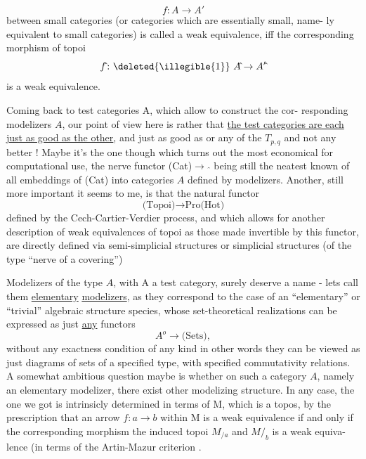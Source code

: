 \[ f\colon A \longrightarrow A' \]
between small categories (or categories which are essentially small, name-%
ly equivalent to small categories) is called a weak equivalence, iff the
corresponding morphism of topoi
\[ f\hat{}\colon \deleted{\illegible{1}}\ A\hat{} \to A'\hat{} \]
is a weak equivalence.

Coming back to test categories A, which allow to construct the cor-%
responding modelizers $A\hat{}$, our point of view here is rather that \uline{the test
categories are each just as good  as the other}, and \hand{$\Delta$} just as good as
\hand{$\Box$} or any of the $T_{p,q}$ and not any better ! Maybe it's the one though which
turns out the most economical for computational use, the nerve functor
(Cat)$\to$ \hand{$\Delta$}$\hat{}$ being still the neatest known of all  embeddings of (Cat) into
categories $A\hat{}$ defined by modelizers. Another, still more important 
it seems to me, is that the natural functor
\[ \text{(Topoi)} \longrightarrow \text{Pro(Hot)} \]
defined by the \hand{\v{}}Cech-Cartier-Verdier process, and which allows for another
description of weak equivalences of topoi\hand{,}  as those made invertible by this
functor, are directly defined via semi-simplicial structures or simplicial
structures (of the type ``nerve of a covering'')

Modelizers of the type $A\hat{}$, with A a test category, surely deserve
a name - lets call them \uline{elementary} \uline{modelizers}, as they correspond to 
the case of an ``elementary'' or ``trivial'' algebraic structure species,
whose set-theoretical realizations can be expressed as just \uline{any} functors
\[ A^{o} \longrightarrow \text{(Sets)} , \]
without any exactness condition of any kind\over{,}{;} in other words they can
be viewed as just diagrams of sets of a specified type, with specified
commutativity relations. A somewhat ambitious question maybe is whether
on such a category  $A\hat{}$, namely an elementary modelizer, there   exist
 other modelizing structure. In any case, the one we got is intrinsicly
determined in terms of M, which is a topos, by the prescription that
an arrow $f\colon a \to b$ within M is a weak equivalence if and only if the
corresponding morphism   the induced topoi $M_{/a}$ and $M/_{b}$ is a weak equiva-%
lence (in terms of the Artin-Mazur criterion  \hand{)}.


